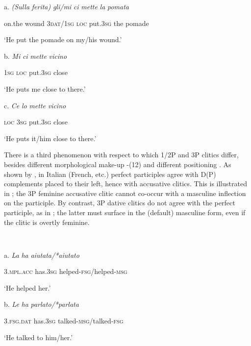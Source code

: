 \documentclass[output=paper]{langscibook}
\begin{document}
a.  \textit{(Sulla} \textit{ferita)}   \textit{gli/mi}    \textit{ci}   \textit{mette} \textit{la} \textit{pomata}



  on.the wound   \textsc{3dat/1sg}   \textsc{loc}   put.\textsc{3sg} the pomade


  ‘He put the pomade on my/his wound.’


  b.  \textit{Mi}  \textit{ci}   \textit{mette}   \textit{vicino}



  \textsc{1sg}  \textsc{loc}  put.\textsc{3sg} close


  ‘He puts me close to there.’


  c.  \textit{Ce}  \textit{lo}  \textit{mette}   \textit{vicino}



  \textsc{loc}  \textsc{3sg}   put.\textsc{3sg} close


  ‘He puts it/him close to there.’

There is a third phenomenon with respect to which 1/2P and 3P clitics differ, besides different morphological make-up -(12) and different positioning . As shown by \citet{Kayne1989}, in Italian (French, etc.) perfect participles agree with D(P) complements placed to their left, hence with accusative clitics. This is illustrated in ; the 3P feminine accusative clitic cannot co-occur with a masculine inflection on the participle. By contrast, 3P dative clitics do not agree with the perfect participle, as in ; the latter must surface in the (default) masculine form, even if the clitic is overtly feminine.

\ea\label{ex:key:}
{}\\
\z

a.  \textit{La}     \textit{ha}     \textit{aiutata/*aiutato}     

  \textsc{3.mpl.acc}  has.\textsc{3sg}    helped-\textsc{fsg/}helped\textsc{{}-msg} 

  ‘He helped her.’

   b.  \textit{Le}       \textit{ha}     \textit{parlato/*parlata}    

  \textsc{3.fsg.dat}  has.\textsc{3sg}    talked-\textsc{msg/}talked\textsc{{}-fsg}

  ‘He talked to him/her.’  
 
\end{document}
